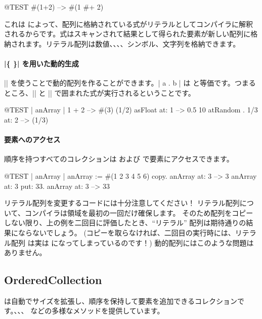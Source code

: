 \documentclass[a4paper,10pt,twoside]{book}
\begin{document}
\begin{code}{@TEST}
#(1+2) -->  #(1 #+ 2)
\end{code}

\noindent
これは \ct{#()} によって、配列に格納されている式がリテラルとしてコンパイラに解釈されるからです。式はスキャンされて結果として得られた要素が新しい配列に格納されます。リテラル配列は数値、、、、シンボル、文字列を格納できます。

\paragraph{\ct|\{ \}| を用いた動的生成}
\ct|{}| を使うことで動的配列を作ることができます。\ct|{ a . b }| は  と等価です。つまるところ、\ct|{| と \ct|}| で囲まれた式が実行されるということです。

\begin{code}{@TEST | anArray |}
{ 1 + 2 } --> #(3)
{(1/2) asFloat} at: 1 --> 0.5
{10 atRandom . 1/3} at: 2 --> (1/3)
\end{code}

\paragraph{要素へのアクセス}
順序を持つすべてのコレクションは  および  で要素にアクセスできます。

\begin{code}{@TEST | anArray |}
anArray := #(1 2 3 4 5 6) copy.
anArray at: 3 --> 3
anArray at: 3 put: 33.
anArray at: 3 --> 33
\end{code}

\noindent
リテラル配列を変更するコードには十分注意してください！
リテラル配列について、コンパイラは領域を最初の一回だけ確保します。
そのため配列をコピーしない限り、上の例を二回目に評価したとき、``リテラル'' 配列は期待通りの結果にならないでしょう。
(コピーを取らなければ、二回目の実行時には、リテラル配列  は実は  になってしまっているのです！)
動的配列にはこのような問題はありません。

\subsection{OrderedCollection}
 は自動でサイズを拡張し、順序を保持して要素を追加できるコレクションです。、、、 などの多様なメソッドを提供しています。
\end{document}
